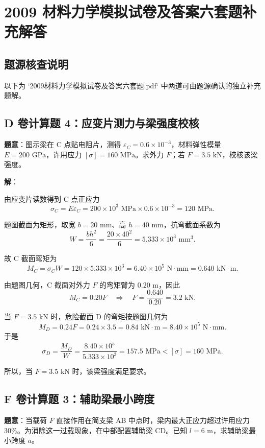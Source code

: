 \documentclass[11pt,a4paper]{ctexrep}
\begin{document}
\chapter{2009 材料力学模拟试卷及答案六套题补充解答}
{



\section*{题源核查说明}

以下为 `2009材料力学模拟试卷及答案六套题.pdf` 中两道可由题源确认的独立补充题解。

\section*{D 卷计算题 4：应变片测力与梁强度校核}

\textbf{题意}：图示梁在 C 点贴电阻片，测得 $\varepsilon_C=0.6\times 10^{-3}$，材料弹性模量 $E=200\text{ GPa}$，许用应力 $[\sigma]=160\text{ MPa}$。求外力 $F$；若 $F=3.5\text{ kN}$，校核该梁强度。

\textbf{解}：

由应变片读数得到 C 点正应力
\[
\sigma_C=E\varepsilon_C
=200\times10^3\text{ MPa}\times0.6\times10^{-3}
=120\text{ MPa}.
\]

题图截面为矩形，取宽 $b=20\text{ mm}$、高 $h=40\text{ mm}$，抗弯截面系数为
\[
W=\frac{bh^2}{6}
=\frac{20\times40^2}{6}
=5.333\times10^3\text{ mm}^3.
\]

故 C 截面弯矩为
\[
M_C=\sigma_C W
=120\times5.333\times10^3
=6.40\times10^5\text{ N}\cdot\text{mm}
=0.640\text{ kN}\cdot\text{m}.
\]

由题图几何，C 截面对外力 $F$ 的弯矩臂为 $0.20\text{ m}$，因此
\[
M_C=0.20F
\quad\Rightarrow\quad
F=\frac{0.640}{0.20}=3.2\text{ kN}.
\]

当 $F=3.5\text{ kN}$ 时，危险截面 D 的弯矩按题图几何为
\[
M_D=0.24F=0.24\times3.5=0.84\text{ kN}\cdot\text{m}
=8.40\times10^5\text{ N}\cdot\text{mm}.
\]
于是
\[
\sigma_D=\frac{M_D}{W}
=\frac{8.40\times10^5}{5.333\times10^3}
=157.5\text{ MPa}<[\sigma]=160\text{ MPa}.
\]

所以，当 $F=3.5\text{ kN}$ 时，该梁强度满足要求。

\section*{F 卷计算题 3：辅助梁最小跨度}

\textbf{题意}：当载荷 $F$ 直接作用在简支梁 AB 中点时，梁内最大正应力超过许用应力 $30\%$。为消除这一过载现象，在中部配置辅助梁 CD。已知 $l=6\text{ m}$，求辅助梁最小跨度 $a$。

}
\end{document}
